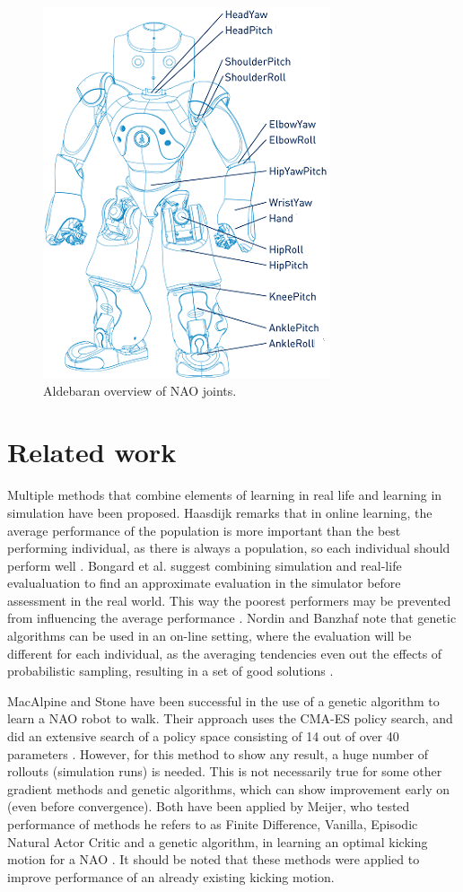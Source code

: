 \documentclass{article}
\begin{document}
\begin{figure}
	\center
	\includegraphics[scale=.8]{images/naospecsJoints}
	\caption{Aldebaran overview of NAO joints.}
	\label{fig:joints}
\end{figure}

\section{Related work}
Multiple methods that combine elements of learning in real life and learning in simulation
have been proposed. Haasdijk remarks that in online learning, the average
performance of the population is more important than the best performing
individual, as there is always a population, so each individual should perform
well \cite{haasdijk2012never}. Bongard et al. suggest combining simulation
and real-life evalualuation to find an approximate evaluation in the simulator
before assessment in the real world. This way the poorest performers may be
prevented from influencing the average performance \cite{bongard2006resilient}.
Nordin and Banzhaf note that genetic algorithms can be used in an on-line
setting, where the evaluation will be different for each individual, as the
averaging tendencies even out the effects of probabilistic sampling, resulting
in a set of good solutions \cite{nordin1997line}.

MacAlpine and Stone have been successful in the use of a genetic algorithm
to learn a NAO robot to walk. Their approach uses the CMA-ES policy search,
and did an extensive search of a policy space consisting of 14 out of over 40
parameters \cite{macalpineusing}. However, for this method to show any result, 
a huge number of rollouts (simulation runs) is needed. This is not necessarily true 
for some other gradient methods and genetic algorithms, which can show improvement 
early on (even before convergence). Both have been applied by Meijer, who tested performance 
of methods he refers to as Finite Difference, Vanilla, Episodic Natural Actor Critic and a 
genetic algorithm, in learning an optimal kicking motion for a NAO \cite{meijer2012getting}. 
It should be noted that these methods were applied to improve performance of an already 
existing kicking motion. 
\end{document}
